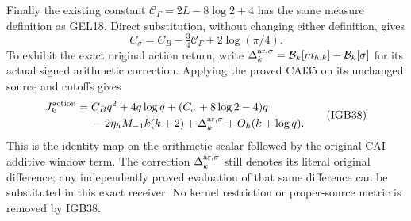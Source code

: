 Finally the existing constant
$\mathcal C_\Gamma=2L-8\log2+4$ has the same measure
definition as GEL18. Direct substitution, without changing
either definition, gives
\[
 C_\sigma=C_B-\tfrac34\mathcal C_\Gamma+2\log(\pi/4).
 \tag{IGB37}
\]
To exhibit the exact original action return, write
$\Delta_k^{\rm ar,\sigma}=
\mathcal B_k[m_{h,k}]-\mathcal B_k[\sigma]$ for its actual
signed arithmetic correction. Applying the proved CAI35
on its unchanged source and cutoffs gives
\[
 \begin{aligned}
 J_k^{\rm action}
 ={}&C_Bq^2+4q\log q+
       (C_\sigma+8\log2-4)q\\
 &-2\eta_hM_{-1}k(k+2)+
        \Delta_k^{\rm ar,\sigma}+O_h(k+\log q).
 \end{aligned}\tag{IGB38}
\]
This is the identity map on the arithmetic scalar followed by
the original CAI additive window term. The correction
$\Delta_k^{\rm ar,\sigma}$ still denotes its literal original
difference; any independently proved evaluation of that same
difference can be substituted in this exact receiver. No kernel
restriction or proper-source metric is removed by IGB38.

